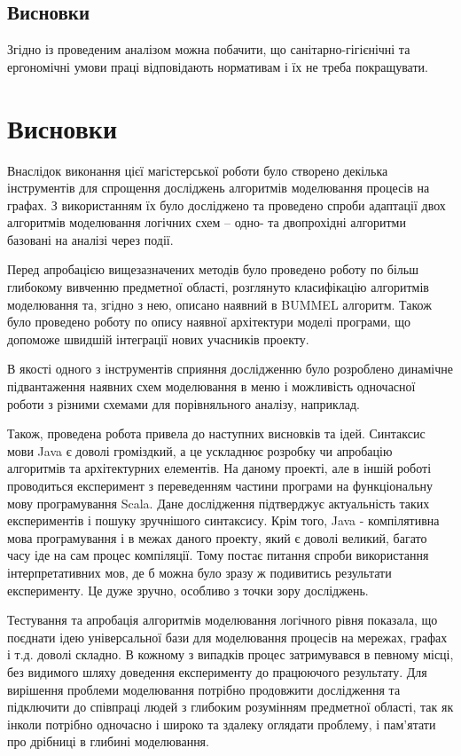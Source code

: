 \documentclass[12pt,a4paper]{article}
\begin{document}
\subsection{Висновки}
Згідно із проведеним аналізом можна побачити, що санітарно-гігієнічні та ергономічні умови праці відповідають нормативам і їх не треба покращувати. 

\clearpage
 
\section{Висновки}

Внаслідок виконання цієї магістерської роботи було створено декілька інструментів для спрощення досліджень алгоритмів моделювання процесів на графах. З використанням їх було досліджено та проведено спроби адаптації двох алгоритмів моделювання логічних схем -- одно- та двопрохідні алгоритми базовані на аналізі через події.

Перед апробацією вищезазначених методів було проведено роботу по більш глибокому вивченню предметної області, розглянуто класифікацію алгоритмів моделювання та, згідно з нею, описано наявний в BUMMEL алгоритм. Також було проведено роботу по опису наявної архітектури моделі програми, що допоможе швидшій інтеграції нових учасників проекту.

В якості одного з інструментів сприяння дослідженню було розроблено динамічне підвантаження наявних схем моделювання в меню і можливість одночасної роботи з різними схемами для порівняльного аналізу, наприклад.

Також, проведена робота привела до наступних висновків та ідей. Синтаксис мови Java є доволі громіздкий, а це ускладнює розробку чи апробацію алгоритмів та архітектурних елементів. На даному проекті, але в іншій роботі проводиться експеримент з переведенням частини програми на функціональну мову програмування Scala. Дане дослідження підтверджує актуальність таких експериментів і пошуку зручнішого синтаксису. Крім того, Java - компілятивна мова програмування і в межах даного проекту, який є доволі великий, багато часу іде на сам процес компіляції. Тому постає питання спроби використання інтерпретативних мов, де б можна було зразу ж подивитись результати експерименту. Це дуже зручно, особливо з точки зору досліджень.

Тестування та апробація алгоритмів моделювання логічного рівня показала, що поєднати ідею універсальної бази для моделювання процесів на мережах, графах і т.д. доволі складно. В кожному з випадків процес затримувався в певному місці, без видимого шляху доведення експерименту до працюючого результату. Для вирішення проблеми моделювання потрібно продовжити дослідження та підключити до співпраці людей з глибоким розумінням предметної області, так як інколи потрібно одночасно і широко та здалеку оглядати проблему, і пам’ятати про дрібниці в глибині моделювання.
\end{document}
